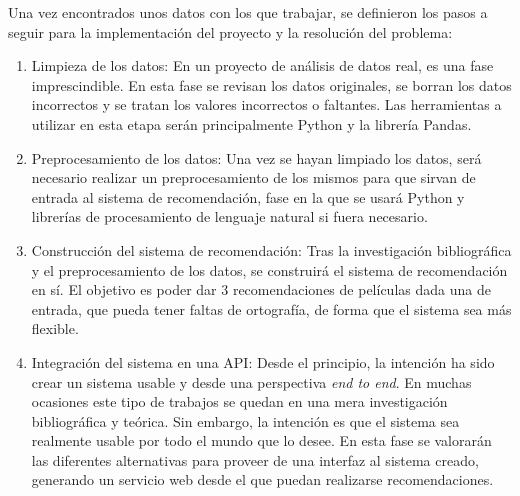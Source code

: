 Una vez encontrados unos datos con los que trabajar, se definieron los pasos a seguir para la implementación del proyecto y la resolución del problema:
\begin{enumerate}
    \item Limpieza de los datos: En un proyecto de análisis de datos real, es una fase imprescindible. En esta fase se revisan los datos originales, se borran los datos incorrectos y se tratan los valores incorrectos o faltantes. Las herramientas a utilizar en esta etapa serán principalmente Python y la librería Pandas.
    \item Preprocesamiento de los datos: Una vez se hayan limpiado los datos, será necesario realizar un preprocesamiento de los mismos para que sirvan de entrada al sistema de recomendación, fase en la que se usará Python y librerías de procesamiento de lenguaje natural si fuera necesario.
    \item Construcción del sistema de recomendación: Tras la investigación bibliográfica y el preprocesamiento de los datos, se construirá el sistema de recomendación en sí. El objetivo es poder dar 3 recomendaciones de películas dada una de entrada, que pueda tener faltas de ortografía, de forma que el sistema sea más flexible.
    \item Integración del sistema en una API: Desde el principio, la intención ha sido crear un sistema usable y desde una perspectiva \textit{end to end}. En muchas ocasiones este tipo de trabajos se quedan en una mera investigación bibliográfica y teórica. Sin embargo, la intención es que el sistema sea realmente usable por todo el mundo que lo desee. En esta fase se valorarán las diferentes alternativas para proveer de una interfaz al sistema creado, generando un servicio web desde el que puedan realizarse recomendaciones.
\end{enumerate}